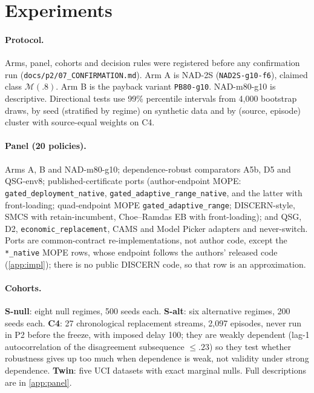 \section{Experiments}\label{sec:experiments}


\paragraph{Protocol.} Arms, panel, cohorts and decision rules were registered before any
confirmation run (\texttt{docs/p2/07\_CONFIRMATION.md}). Arm A is NAD-2S (\texttt{NAD2S-g10-f6}),
claimed class $\mathcal M(.8)$. Arm B is the payback variant \texttt{PB80-g10}. NAD-m80-g10 is
descriptive. Directional tests use 99\% percentile intervals from 4{,}000 bootstrap draws, by seed
(stratified by regime) on synthetic data and by (source, episode) cluster with source-equal weights on
C4.

\paragraph{Panel (20 policies).} Arms A, B and NAD-m80-g10; dependence-robust comparators A5b, D5 and
QSG-env8; published-certificate ports (author-endpoint MOPE: \texttt{gated\_deployment\_native},
\texttt{gated\_adaptive\_range\_native}, and the latter with front-loading; quad-endpoint MOPE
\texttt{gated\_adaptive\_range}; DISCERN-style, SMCS with retain-incumbent, Choe--Ramdas EB with
front-loading); and QSG, D2, \texttt{economic\_replacement}, CAMS and Model Picker adapters and
never-switch. Ports are common-contract re-implementations, not author code, except the
\texttt{*\_native} MOPE rows, whose endpoint follows the authors' released code
(\cref{app:impl}); there is no public DISCERN code, so that row is an approximation.

\paragraph{Cohorts.} \textbf{S-null}: eight null regimes, 500 seeds each. \textbf{S-alt}: six
alternative regimes, 200 seeds each. \textbf{C4}: 27 chronological replacement streams, 2{,}097
episodes, never run in P2 before the freeze, with imposed delay 100; they are weakly dependent
(lag-1 autocorrelation of the disagreement subsequence $\le.23$) so they test whether robustness
gives up too much when dependence is weak, not validity under strong dependence. \textbf{Twin}: five
UCI datasets with exact marginal nulls. Full descriptions are in \cref{app:panel}.

